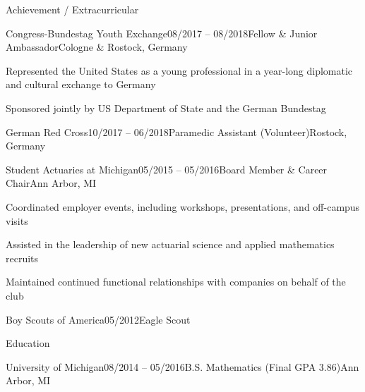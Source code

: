 \documentclass{resume}
\begin{document}
    \begin{cvSection}{Achievement / Extracurricular}

        \begin{cvSubsection}{Congress-Bundestag Youth Exchange}{08/2017 -- 08/2018}{Fellow \& Junior Ambassador}{Cologne \& Rostock, Germany}
            \item Represented the United States as a young professional in a year-long diplomatic
            and cultural exchange to Germany
            \item Sponsored jointly by US Department of State and the German Bundestag
        \end{cvSubsection}

        \begin{cvSubsection}{German Red Cross}{10/2017 -- 06/2018}{Paramedic Assistant (Volunteer)}{Rostock, Germany}
        \end{cvSubsection}

        \begin{cvSubsection}{Student Actuaries at Michigan}{05/2015 -- 05/2016}{Board Member \& Career Chair}{Ann Arbor, MI}
            \item Coordinated employer events, including workshops, presentations, and off-campus visits
            \item Assisted in the leadership of new actuarial science and applied mathematics recruits
            \item Maintained continued functional relationships with companies on behalf of the club
        \end{cvSubsection}

        \begin{cvSubsection}{Boy Scouts of America}{05/2012}{Eagle Scout}{}
        \end{cvSubsection}

    \end {cvSection}

    \begin{cvSection}{Education}


        \begin{cvSubsection}{University of Michigan}{08/2014 -- 05/2016}{B.S. Mathematics (Final GPA 3.86)}{Ann Arbor, MI}
        \end{cvSubsection}

    \end {cvSection}
\end{document}
